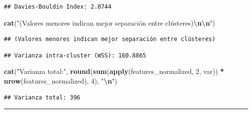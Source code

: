 \documentclass[
]{article}
\newenvironment{Shaded}{\begin{snugshade}}{\end{snugshade}}
\newcommand{\CommentTok}[1]{\textcolor[rgb]{0.56,0.35,0.01}{\textit{#1}}}
\newcommand{\DecValTok}[1]{\textcolor[rgb]{0.00,0.00,0.81}{#1}}
\newcommand{\FunctionTok}[1]{\textcolor[rgb]{0.13,0.29,0.53}{\textbf{#1}}}
\newcommand{\NormalTok}[1]{#1}
\newcommand{\SpecialCharTok}[1]{\textcolor[rgb]{0.81,0.36,0.00}{\textbf{#1}}}
\newcommand{\StringTok}[1]{\textcolor[rgb]{0.31,0.60,0.02}{#1}}
\begin{document}
\begin{verbatim}
## Davies-Bouldin Index: 2.0744
\end{verbatim}

\begin{Shaded}
\begin{Highlighting}[]
\FunctionTok{cat}\NormalTok{(}\StringTok{"(Valores menores indican mejor separación entre clústeres)}\SpecialCharTok{\textbackslash{}n\textbackslash{}n}\StringTok{"}\NormalTok{)}
\end{Highlighting}
\end{Shaded}

\begin{verbatim}
## (Valores menores indican mejor separación entre clústeres)
\end{verbatim}

\begin{Shaded}
\end{Shaded}

\begin{verbatim}
## Varianza intra-cluster (WSS): 160.8865
\end{verbatim}

\begin{Shaded}
\begin{Highlighting}[]
\FunctionTok{cat}\NormalTok{(}\StringTok{"Varianza total:"}\NormalTok{, }\FunctionTok{round}\NormalTok{(}\FunctionTok{sum}\NormalTok{(}\FunctionTok{apply}\NormalTok{(features\_normalized, }\DecValTok{2}\NormalTok{, var)) }\SpecialCharTok{*} \FunctionTok{nrow}\NormalTok{(features\_normalized), }\DecValTok{4}\NormalTok{), }\StringTok{"}\SpecialCharTok{\textbackslash{}n}\StringTok{"}\NormalTok{)}
\end{Highlighting}
\end{Shaded}

\begin{verbatim}
## Varianza total: 396
\end{verbatim}

\begin{center}\rule{0.5\linewidth}{0.5pt}\end{center}
\end{document}
